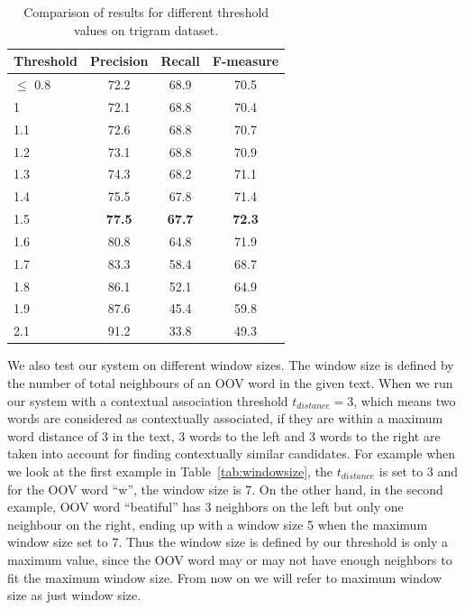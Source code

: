 \documentclass[a4paper,onesided,12pt]{report}
\begin{document}
\begin{table}[thb]
  \caption{Comparison of results for different threshold values on trigram dataset.}
  \centering
  \begin{tabular}[th]{|l|c|c|c|}
    \hline
    \textbf{Threshold} & \textbf{Precision} & \textbf{Recall} & \textbf{F-measure} \\
    \hline
    $\leq$ 0.8 &	72.2 & 68.9  &	70.5 \\\hline
    1   & 72.1 & 68.8 &	70.4 \\\hline
    1.1 & 72.6 & 68.8 &	70.7 \\\hline
    1.2 & 73.1 & 68.8 &	70.9 \\\hline
    1.3 & 74.3 & 68.2 & 71.1 \\\hline
    1.4 & 75.5 & 67.8 &	71.4 \\\hline
    1.5 &  \textbf{77.5}  & \textbf{67.7} &  \textbf{72.3} \\\hline
    1.6 & 80.8	& 64.8	& 71.9 \\\hline
    1.7	& 83.3	& 58.4	& 68.7 \\\hline
    1.8	& 86.1	& 52.1	& 64.9 \\\hline
    1.9	& 87.6	& 45.4	& 59.8 \\    \hline
    2.1	& 91.2	& 33.8	& 49.3 \\    \hline
  \end{tabular}
\label{tab:thresholdspenn}
\end{table}

We also test our system on different window sizes. The window size is defined by the number of total neighbours of an OOV word in the given text. When we run our system with a contextual association threshold $t_{distance}=3$, which means two words are considered as contextually associated, if they are within a maximum word distance of 3 in the text, 3 words to the left and 3 words to the right are taken into account for finding contextually similar candidates. For example when we look at the first example in Table~\ref{tab:windowsize}, the $t_{distance}$ is set to 3 and  for the OOV word ``w'', the window size is 7. On the other hand, in the second example, OOV word ``beatiful'' has 3 neighbors on the left but only one neighbour on the right, ending up with a window size 5 when the maximum window size set to 7. Thus the window size is defined by our threshold is only a maximum value, since the OOV word may or may not have enough neighbors to fit the maximum window size. From now on we will refer to maximum window size as just window size.
\end{document}
